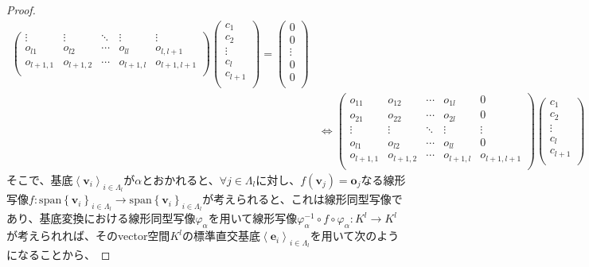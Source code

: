 \documentclass[dvipdfmx]{jsarticle}
\begin{document}
\begin{proof}
\begin{align*}
\begin{pmatrix}
 \vdots & \vdots & \ddots & \vdots & \vdots \\
o_{l1} & o_{l2} & \cdots & o_{ll} & o_{l,l + 1} \\
o_{l + 1,1} & o_{l + 1,2} & \cdots & o_{l + 1,l} & o_{l + 1,l + 1} \\
\end{pmatrix}\begin{pmatrix}
c_{1} \\
c_{2} \\
 \vdots \\
c_{l} \\
c_{l + 1} \\
\end{pmatrix} = \begin{pmatrix}
0 \\
0 \\
 \vdots \\
0 \\
0 \\
\end{pmatrix}\\
&\Leftrightarrow \begin{pmatrix}
o_{11} & o_{12} & \cdots & o_{1l} & 0 \\
o_{21} & o_{22} & \cdots & o_{2l} & 0 \\
 \vdots & \vdots & \ddots & \vdots & \vdots \\
o_{l1} & o_{l2} & \cdots & o_{ll} & 0 \\
o_{l + 1,1} & o_{l + 1,2} & \cdots & o_{l + 1,l} & o_{l + 1,l + 1} \\
\end{pmatrix}\begin{pmatrix}
c_{1} \\
c_{2} \\
 \vdots \\
c_{l} \\
c_{l + 1} \\
\end{pmatrix} = \begin{pmatrix}
0 \\
0 \\
 \vdots \\
0 \\
0 \\
\end{pmatrix}
\end{align*}
そこで、基底$\left\langle \mathbf{v}_{i} \right\rangle_{i \in \varLambda_{l}}$が$\alpha$とおかれると、$\forall j \in \varLambda_{l}$に対し、$f\left( \mathbf{v}_{j} \right) = \mathbf{o}_{j}$なる線形写像$f:\mathrm{span}\left\{ \mathbf{v}_{i} \right\}_{i \in \varLambda_{l}} \rightarrow \mathrm{span}\left\{ \mathbf{v}_{i} \right\}_{i \in \varLambda_{l}}$が考えられると、これは線形同型写像であり、基底変換における線形同型写像$\varphi_{\alpha}$を用いて線形写像$\varphi_{\alpha}^{- 1} \circ f \circ \varphi_{\alpha}:K^{l} \rightarrow K^{l}$が考えられれば、そのvector空間$K^{l}$の標準直交基底$\left\langle \mathbf{e}_{i} \right\rangle_{i \in \varLambda_{l}}$を用いて次のようになることから、

\end{proof}
\end{document}

